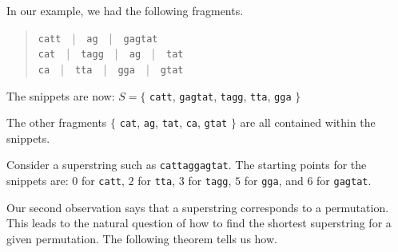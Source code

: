 \begin{cluster}
\label{grp:xmpl:genome::fragments}

\begin{example}
\label{xmpl:genome::fragments}
In our example, we had the following fragments.

\begin{quote}
\texttt{catt}~~|~~\texttt{ag}~~|~~\texttt{gagtat}
\\
\texttt{cat}~~|~~\texttt{tagg}~~|~~\texttt{ag}~~|~~\texttt{tat}
\\
\texttt{ca}~~|~~\texttt{tta}~~|~~\texttt{gga}~~|~~\texttt{gtat}
\end{quote}

The snippets are now:
$S = \{$
\texttt{catt}, \texttt{gagtat}, \texttt{tagg},  \texttt{tta}, \texttt{gga}
$\}$


The other fragments
$\{$
\texttt{cat}, \texttt{ag}, \texttt{tat},
\texttt{ca}, \texttt{gtat}
$ \}$ are all contained within the snippets.

Consider a superstring such as \texttt{cattaggagtat}.  The starting
points for the snippets are: 
$0$ for \texttt{catt}, 
$2$ for \texttt{tta},
$3$ for \texttt{tagg},
$5$ for \texttt{gga}, and
$6$ for \texttt{gagtat}.

\end{example}
\end{cluster}

\begin{cluster}
\label{grp:grm:genome::shortest-superstring-of-a-permutation}

\begin{gram}
\label{grm:genome::shortest-superstring-of-a-permutation}
Our second observation says that a superstring corresponds to a
permutation.  This leads to the natural question of how to find the
shortest superstring for a given permutation.
The following theorem tells us how.

\end{gram}
\end{cluster}

